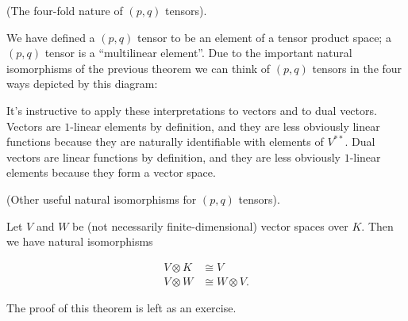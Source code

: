 \begin{remark}
    (The four-fold nature of $(p, q)$ tensors).
    
    We have defined a $(p, q)$ tensor to be an element of a tensor product space; a $(p, q)$ tensor is a ``multilinear element''. Due to the important natural isomorphisms of the previous theorem we can think of $(p, q)$ tensors in the four ways depicted by this diagram:
    
    \begin{center}
    \end{center}
    
    It's instructive to apply these interpretations to vectors and to dual vectors. Vectors are $1$-linear elements by definition, and they are less obviously linear functions because they are naturally identifiable with elements of $V^{**}$. Dual vectors are linear functions by definition, and they are less obviously $1$-linear elements because they form a vector space.
\end{remark}

\begin{theorem}
    (Other useful natural isomorphisms for $(p, q)$ tensors).

    Let $V$ and $W$ be (not necessarily finite-dimensional) vector spaces over $K$. Then we have natural isomorphisms

     \begin{align*}
         V \otimes K &\cong V \\
         V \otimes W &\cong W \otimes V.
     \end{align*}
     
     The proof of this theorem is left as an exercise.
\end{theorem}